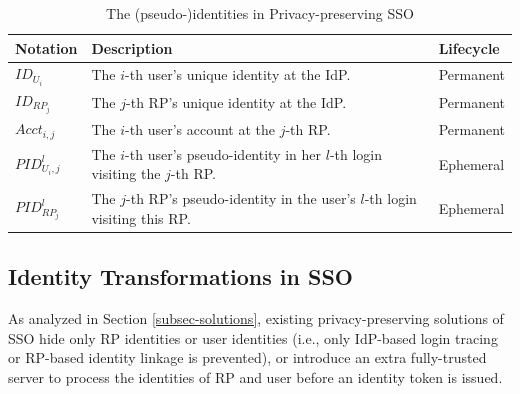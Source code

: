 
\begin{table}[t]
\footnotesize
    \caption{The (pseudo-)identities in Privacy-preserving SSO}
    \centering
    \begin{tabular}{|l|p{5.15cm}|l|} \hline
    {\textbf{Notation}} & {\textbf{Description}} & {\textbf{Lifecycle}} \\ \hline
    {$ID_{U_i}$} & {The $i$-th user's unique identity at the IdP.} & {Permanent} \\ \hline
    {$ID_{RP_j}$} & {The $j$-th RP's unique identity at the IdP.} & {Permanent} \\ \hline
    {$Acct_{i,j}$} & {The $i$-th user's account at the $j$-th RP.} & {Permanent} \\ \hline
    {$PID_{U_i,j}^l$} & {The $i$-th user's pseudo-identity in her $l$-th login visiting the $j$-th RP.} & {Ephemeral} \\ \hline
    {$PID_{RP_j}^l$} & {The $j$-th RP's pseudo-identity in the user's $l$-th login visiting this RP.} & {Ephemeral} \\ \hline
    \end{tabular}
    \label{tbl:notations-dilemma}
\end{table}


\subsection{Identity Transformations in SSO}
\label{subsec:solutions}


As analyzed in Section \ref{subsec-solutions},
    existing privacy-preserving solutions of SSO hide only RP identities or user identities
    (i.e., only IdP-based login tracing or RP-based identity linkage is prevented),
        or introduce an extra fully-trusted server to process the identities of RP and user before an identity token is issued.

